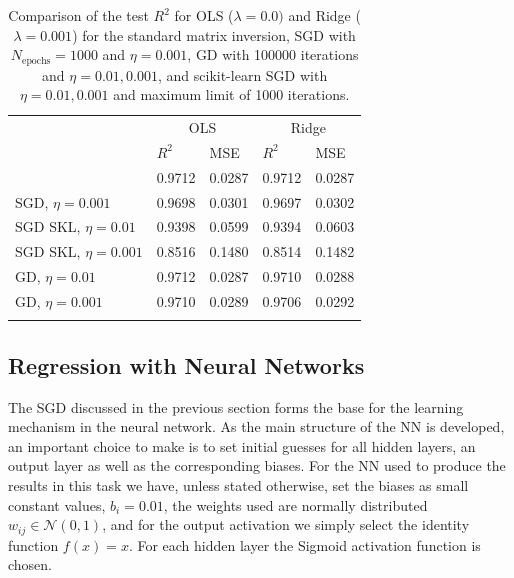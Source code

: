 \documentclass{emulateapj}
\begin{document}
\begin{table}[!htb]
\begin{center}
\caption{\scriptsize Comparison of the test $R^2$ for OLS ($\lambda=0.0) $ and Ridge ($\lambda=0.001$) for the standard matrix inversion, SGD with $N_{\mathrm{epochs}}=1000$ and $\eta=0.001$, GD with 100000 iterations and $\eta=0.01,0.001$, and scikit-learn SGD with $\eta=0.01,0.001$ and maximum limit of 1000 iterations. }
\label{tab:OLS vs ridge}  
\begin{tabular}{lllll}
\cline{2-5}\noalign{\smallskip}\cline{2-5}\noalign{\smallskip}
& \multicolumn{2}{c}{OLS} & \multicolumn{2}{c}{Ridge} \\ \cline{2-5}\noalign{\smallskip} 
& $R^2$ & MSE & $R^2$ & MSE \\ \hline\noalign{\smallskip}
\multicolumn{1}{l|}{Mat.inv.} & 0.9712 & 0.0287 & 0.9712 & 0.0287\\
\multicolumn{1}{l|}{SGD, $\eta=0.001$} & 0.9698 & 0.0301 & 0.9697 & 0.0302\\
\multicolumn{1}{l|}{SGD SKL, $\eta=0.01$} & 0.9398  & 0.0599 & 0.9394 & 0.0603\\
\multicolumn{1}{l|}{SGD SKL, $\eta=0.001$} & 0.8516  & 0.1480 & 0.8514 & 0.1482\\
\multicolumn{1}{l|}{GD, $\eta=0.01$} & 0.9712 & 0.0287 & 0.9710 & 0.0288\\
\multicolumn{1}{l|}{GD, $\eta=0.001$} & 0.9710 & 0.0289 & 0.9706 & 0.0292\\ \noalign{\smallskip}\hline
\end{tabular}
\end{center}
\end{table}

\subsection{Regression with Neural Networks}
\label{subsec:regression neural network}

The SGD discussed in the previous section forms the base for the learning mechanism in the neural network. As the main structure of the NN is developed, an important choice to make is to set initial guesses for all hidden layers, an output layer as well as the corresponding biases. For the NN used to produce the results in this task we have, unless stated otherwise, set the biases as small constant values, $b_i=0.01$, the weights used are normally distributed $w_{ij}\in\mathcal{N}(0,1)$, and for the output activation we simply select the identity function $f(x) = x$. For each hidden layer the Sigmoid activation function is chosen.
\end{document}
